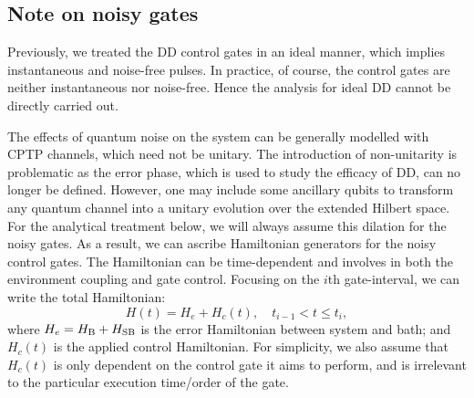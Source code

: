 \documentclass[b5paper,11pt]{article}
\begin{document}
\subsection{Note on noisy gates}
Previously, we treated the DD control gates in an ideal manner, which implies instantaneous and noise-free pulses. In practice, of course, the control gates are neither instantaneous nor noise-free. Hence the analysis for ideal DD cannot be directly carried out.

The effects of quantum noise on the system can be generally modelled with CPTP channels, which need not be unitary. The introduction of non-unitarity is problematic as the error phase, which is used to study the efficacy of DD, can no longer be defined.
However, one may include some ancillary qubits to transform any quantum channel into a unitary evolution over the extended Hilbert space. For the analytical treatment below, we will always assume this dilation for the noisy gates. As a result, we can ascribe Hamiltonian generators for the noisy control gates. 
The Hamiltonian can be time-dependent and involves in both the environment coupling and gate control.
Focusing on the $i$th gate-interval,  we can write the total Hamiltonian:
\begin{equation}\label{eq:noisy-Hamiltonian}
 H(t) = H_e + H_c(t), \quad t_{i-1}< t \le t_i,
\end{equation}
where $H_e=H_{\mathrm{B}}+H_{\mathrm{SB}}$ is the error Hamiltonian between system and bath;
and $H_c(t)$ is the applied control Hamiltonian.
For simplicity, we also assume that $H_c(t)$ is 
only dependent on the control gate it aims to perform, and is irrelevant to the 
particular execution time/order of the gate.
\end{document}
